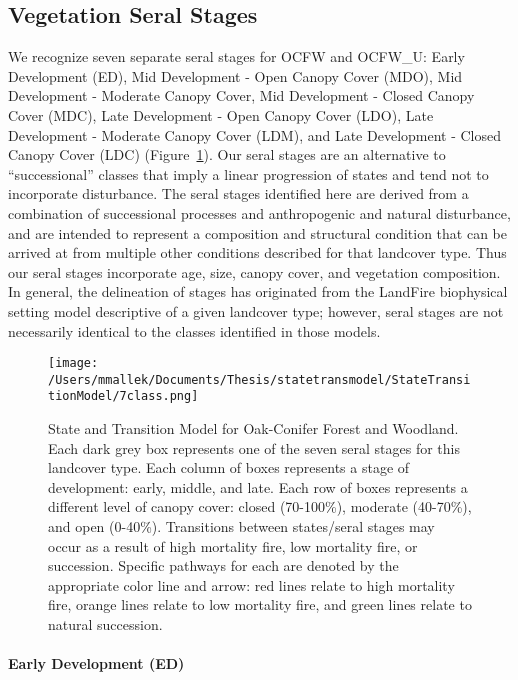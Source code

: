 \subsection*{Vegetation Seral Stages}
We recognize seven separate seral stages for OCFW and OCFW\_U: Early Development (ED), Mid Development - Open Canopy Cover (MDO), Mid Development - Moderate Canopy Cover, Mid Development - Closed Canopy Cover (MDC), Late Development - Open Canopy Cover (LDO), Late Development - Moderate Canopy Cover (LDM), and Late Development - Closed Canopy Cover (LDC) (Figure~\ref{transmodel_ocfw}). Our seral stages are an alternative to ``successional'' classes that imply a linear progression of states and tend not to incorporate disturbance. The seral stages identified here are derived from a combination of successional processes and anthropogenic and natural disturbance, and are intended to represent a composition and structural condition that can be arrived at from multiple other conditions described for that landcover type. Thus our seral stages incorporate age, size, canopy cover, and vegetation composition. In general, the delineation of stages has originated from the LandFire biophysical setting model descriptive of a given landcover type; however, seral stages are not necessarily identical to the classes identified in those models.

\begin{figure}[htbp]
\centering
\texttt{[image: /Users/mmallek/Documents/Thesis/statetransmodel/StateTransitionModel/7class.png]}
\caption{State and Transition Model for Oak-Conifer Forest and Woodland. Each dark grey box represents one of the seven seral stages for this landcover type. Each column of boxes represents a stage of development: early, middle, and late. Each row of boxes represents a different level of canopy cover: closed (70-100\%), moderate (40-70\%), and open (0-40\%). Transitions between states/seral stages may occur as a result of high mortality fire, low mortality fire, or succession. Specific pathways for each are denoted by the appropriate color line and arrow: red lines relate to high mortality fire, orange lines relate to low mortality fire, and green lines relate to natural succession.} 
\label{transmodel_ocfw}
\end{figure}

\paragraph*{Early Development (ED)} 


